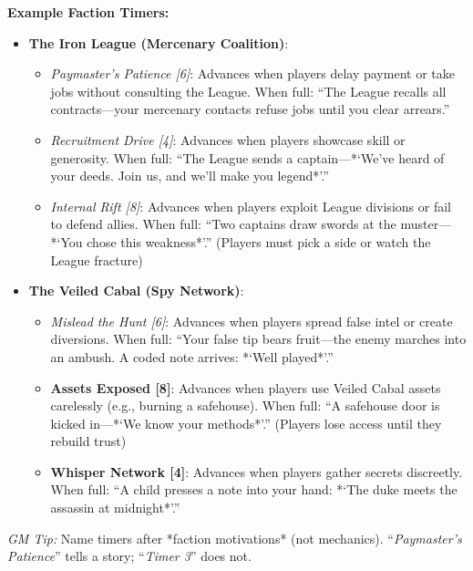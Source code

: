 \textbf{Example Faction Timers:}
\begin{itemize}
  \item \textbf{The Iron League (Mercenary Coalition)}: 
        \begin{itemize}
          \item \emph{Paymaster's Patience [6]}: Advances when players delay payment or take jobs without consulting the League. When full: ``The League recalls all contracts---your mercenary contacts refuse jobs until you clear arrears.'' 
          \item \emph{Recruitment Drive [4]}: Advances when players showcase skill or generosity. When full: ``The League sends a captain---*`We've heard of your deeds. Join us, and we'll make you legend*'.'' 
          \item \emph{Internal Rift [8]}: Advances when players exploit League divisions or fail to defend allies. When full: ``Two captains draw swords at the muster---*`You chose this weakness*'.'' (Players must pick a side or watch the League fracture) 
        \end{itemize}
  \item \textbf{The Veiled Cabal (Spy Network)}: 
        \begin{itemize}
          \item \emph{Mislead the Hunt [6]}: Advances when players spread false intel or create diversions. When full: ``Your false tip bears fruit---the enemy marches into an ambush. A coded note arrives: *`Well played*'.'' 
          \item \textbf{Assets Exposed [8]}: Advances when players use Veiled Cabal assets carelessly (e.g., burning a safehouse). When full: ``A safehouse door is kicked in---*`We know your methods*'.'' (Players lose access until they rebuild trust) 
          \item \textbf{Whisper Network [4]}: Advances when players gather secrets discreetly. When full: ``A child presses a note into your hand: *`The duke meets the assassin at midnight*'.'' 
        \end{itemize}
\end{itemize}
\textit{GM Tip:} Name timers after *faction motivations* (not mechanics). ``\emph{Paymaster's Patience}'' tells a story; ``\emph{Timer 3}'' does not.


